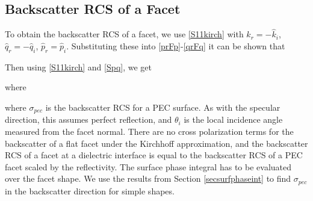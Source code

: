 \subsection{Backscatter RCS of a Facet}

To obtain the backscatter RCS of a facet, we use \eqref{S11kirch} with $\hat{k}_r = -\hat{k}_i$, $\hat{q}_r = -\hat{q}_i$, $\hat{p}_r = \hat{p}_i$. Substituting these into \eqref{prFp}-\eqref{qrFq} it can be shown that 

Then using  \eqref{S11kirch} and \eqref{Spq}, we get

where 

\noindent where $\sigma_{pec}$ is the backscatter RCS for a PEC surface. As with the specular direction, this assumes perfect reflection, and $\theta_i$ is the local incidence angle measured from the facet normal. There are no cross polarization terms for the backscatter of a flat facet under the Kirchhoff approximation, and the backscatter RCS of a facet at a dielectric interface is equal to the backscatter RCS of a PEC facet scaled by the reflectivity. The surface phase integral has to be evaluated over the facet shape. We use the results from Section \ref{secsurfphaseint} to find $\sigma_{pec}$ in the backscatter direction for simple shapes.

